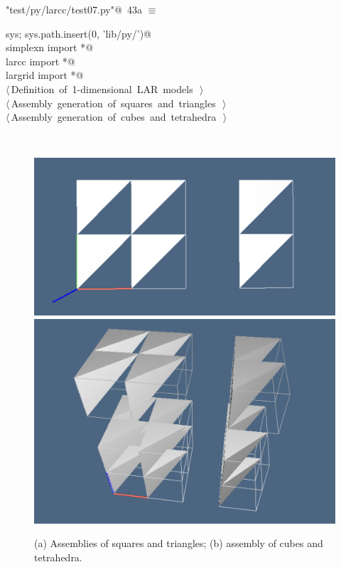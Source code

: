 \documentclass[11pt,oneside]{article}	%
\begin{document}
\begin{flushleft} \small
\begin{minipage}{\linewidth} \label{scrap93}
\protect{}\verb@"test/py/larcc/test07.py"@\nobreak\ {\footnotesize 43a }$\equiv$
\vspace{-1ex}
\begin{list}{}{} \item
\mbox{}\verb@import sys; sys.path.insert(0, 'lib/py/')@\\
\mbox{}\verb@from simplexn import *@\\
\mbox{}\verb@from larcc import *@\\
\mbox{}\verb@from largrid import *@\\
\mbox{}\verb@@\hbox{$\langle\,$Definition of 1-dimensional LAR models\nobreak\ {\footnotesize {}}$\,\rangle$}\verb@@\\
\mbox{}\verb@@\hbox{$\langle\,$Assembly generation of squares and triangles\nobreak\ {\footnotesize {}}$\,\rangle$}\verb@@\\
\mbox{}\verb@@\hbox{$\langle\,$Assembly generation of cubes and tetrahedra\nobreak\ {\footnotesize {}}$\,\rangle$}\verb@@\\
\mbox{}\verb@@{\NWsep}
\end{list}
\vspace{-2ex}
\end{minipage}\\[4ex]
\end{flushleft}

\begin{figure}[htbp] %
   \centering
   \includegraphics[width=0.405\linewidth]{images/assembly1} 
   \includegraphics[width=0.315\linewidth]{images/assembly2} 
   \caption{(a) Assemblies of squares and triangles; (b) assembly of cubes and tetrahedra.}
   \label{fig:example}
\end{figure}
\end{document}
